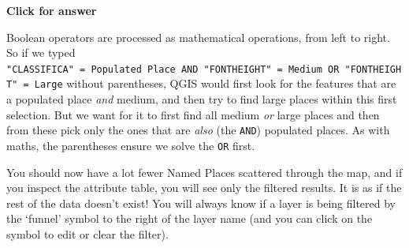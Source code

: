 \documentclass[
  letterpaper,
  DIV=11,
  numbers=noendperiod]{scrreprt}
\begin{document}
\begin{tcolorbox}[enhanced jigsaw, leftrule=.75mm, colframe=quarto-callout-important-color-frame, breakable, toprule=.15mm, bottomrule=.15mm, arc=.35mm, rightrule=.15mm, opacityback=0, colback=white, left=2mm]

\vspace{-3mm}\textbf{Click for answer}\vspace{3mm}

Boolean operators are processed as mathematical operations, from left to
right. So if we typed
\texttt{"CLASSIFICA"\ =\ \textquotesingle{}Populated\ Place\textquotesingle{}\ AND\ "FONTHEIGHT"\ =\ \textquotesingle{}Medium\textquotesingle{}\ OR\ "FONTHEIGHT"\ =\ \textquotesingle{}Large\textquotesingle{}}
without parentheses, QGIS would first look for the features that are a
populated place \emph{and} medium, and then try to find large places
within this first selection. But we want for it to first find all medium
\emph{or} large places and then from these pick only the ones that are
\emph{also} (the \texttt{AND}) populated places. As with maths, the
parentheses ensure we solve the \texttt{OR} first.

\end{tcolorbox}

You should now have a lot fewer Named Places scattered through the map,
and if you inspect the attribute table, you will see only the filtered
results. It is as if the rest of the data doesn't exist! You will always
know if a layer is being filtered by the `funnel' symbol to the right of
the layer name (and you can click on the symbol to edit or clear the
filter).
\end{document}
